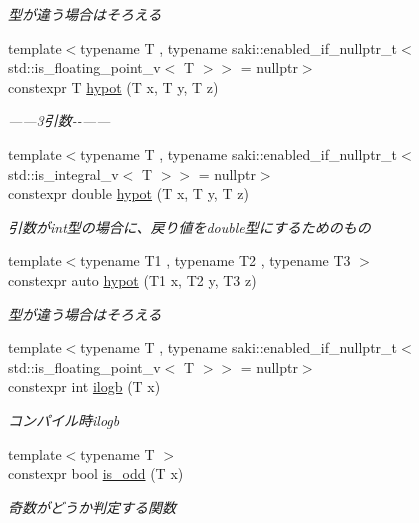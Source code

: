 \begin{DoxyCompactItemize}
\begin{DoxyCompactList}\small\item\em 型が違う場合はそろえる \end{DoxyCompactList}\item 
{\footnotesize template$<$typename T , typename saki\+::enabled\+\_\+if\+\_\+nullptr\+\_\+t$<$ std\+::is\+\_\+floating\+\_\+point\+\_\+v$<$ T $>$$>$  = nullptr$>$ }\\constexpr T \mbox{\hyperlink{namespacesaki_a56768ecf1270205a8c9b3ac8cdf4a590}{hypot}} (T x, T y, T z)
\begin{DoxyCompactList}\small\item\em ------3引数-\/-\/------ \end{DoxyCompactList}\item 
{\footnotesize template$<$typename T , typename saki\+::enabled\+\_\+if\+\_\+nullptr\+\_\+t$<$ std\+::is\+\_\+integral\+\_\+v$<$ T $>$$>$  = nullptr$>$ }\\constexpr double \mbox{\hyperlink{namespacesaki_ad56e1232bb063b3bc0e7cf2b3f655247}{hypot}} (T x, T y, T z)
\begin{DoxyCompactList}\small\item\em 引数がint型の場合に、戻り値をdouble型にするためのもの \end{DoxyCompactList}\item 
{\footnotesize template$<$typename T1 , typename T2 , typename T3 $>$ }\\constexpr auto \mbox{\hyperlink{namespacesaki_ada6f15bbf909992e4840325c0dae0c42}{hypot}} (T1 x, T2 y, T3 z)
\begin{DoxyCompactList}\small\item\em 型が違う場合はそろえる \end{DoxyCompactList}\item 
{\footnotesize template$<$typename T , typename saki\+::enabled\+\_\+if\+\_\+nullptr\+\_\+t$<$ std\+::is\+\_\+floating\+\_\+point\+\_\+v$<$ T $>$$>$  = nullptr$>$ }\\constexpr int \mbox{\hyperlink{namespacesaki_a582e9de82aa8572287c01530ae2626a8}{ilogb}} (T x)
\begin{DoxyCompactList}\small\item\em コンパイル時ilogb \end{DoxyCompactList}\item 
{\footnotesize template$<$typename T $>$ }\\constexpr bool \mbox{\hyperlink{namespacesaki_a03cf21b9e2231e956f8da966f1e09d70}{is\+\_\+odd}} (T x)
\begin{DoxyCompactList}\small\item\em 奇数がどうか判定する関数 \end{DoxyCompactList}\item 

\end{DoxyCompactItemize}
